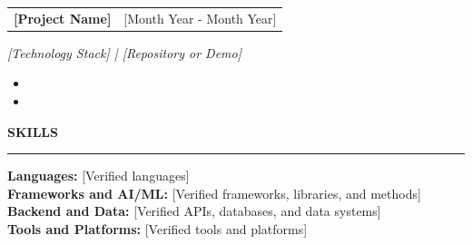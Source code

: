 \documentclass[letterpaper,11pt]{article}
\makeatletter
\newcommand{\sectionfont}{\fontsize{11pt}{12pt}\selectfont\bfseries}
\newcommand{\placeholder}[1]{[#1]}
\newcommand{\resumeSection}[1]{%
  \vspace{4pt}%
  {\sectionfont\MakeUppercase{#1}}\par
  \vspace{1pt}\hrule height 0.45pt\vspace{2pt}%
}
\newcommand{\projectEntry}[3]{%
  \begin{tabular*}{\textwidth}{@{\extracolsep{\fill}}lr}
    \textbf{#1} & #2 \\
  \end{tabular*}\par
  {\itshape #3}\par\vspace{-2pt}%
}
\newenvironment{resumeBullets}{%
  \begin{itemize}[
    leftmargin=0.17in,
    label=\textbullet,
    itemsep=0pt,
    topsep=0pt,
    parsep=0pt,
    partopsep=0pt
  ]
}{%
  \end{itemize}\vspace{1pt}%
}
\makeatother
\begin{document}
\projectEntry
  {\placeholder{Project Name}}
  {\placeholder{Month Year - Month Year}}
  {\placeholder{Technology Stack} | \placeholder{Repository or Demo}}
\begin{resumeBullets}
  \item \placeholder{Verified technical contribution and impact.}
  \item \placeholder{Verified technical contribution and impact.}
\end{resumeBullets}

\resumeSection{Skills}
\textbf{Languages:} \placeholder{Verified languages}\\
\textbf{Frameworks and AI/ML:} \placeholder{Verified frameworks, libraries, and methods}\\
\textbf{Backend and Data:} \placeholder{Verified APIs, databases, and data systems}\\
\textbf{Tools and Platforms:} \placeholder{Verified tools and platforms}
\end{document}

